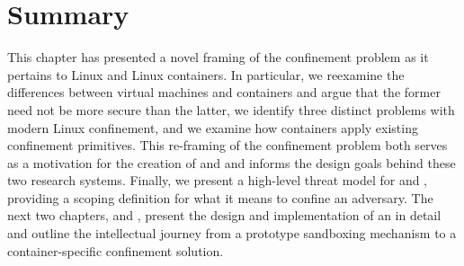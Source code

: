 \section{Summary}

This chapter has presented a novel framing of the confinement problem as it pertains to
Linux and Linux containers. In particular, we reexamine the differences between virtual
machines and containers and argue that the former need not be more secure than the latter,
we identify three distinct problems with modern Linux confinement, and we examine how
containers apply existing confinement primitives. This re-framing of the confinement
problem both serves as a motivation for the creation of \bpfbox{} and \bpfcontain{} and
informs the design goals behind these two research systems. Finally, we present
a high-level threat model for \bpfbox{} and \bpfcontain{}, providing a scoping definition
for what it means to confine an adversary. The next two chapters,  and
, present the design and implementation of \bpfbox{} an \bpfcontain{}
in detail and outline the intellectual journey from a prototype sandboxing mechanism to
a container-specific confinement solution.
